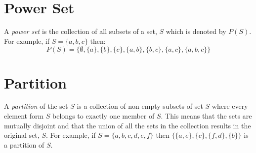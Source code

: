 \section{Power Set}
A \textit{power set} is the collection of all subsets of a set, $S$ which is denoted by $P(S)$. For example, if $S = \{a, b, c\}$ then:
\[P(S) = \{ \emptyset, \{a\}, \{b\}, \{c\}, \{a, b\}, \{b, c\}, \{a, c\}, \{a, b, c\} \}\]

\section{Partition}
A \textit{partition} of the set $S$ is a collection of non-empty subsets of set $S$ where every element form $S$ belongs to exactly one member of $S$. This means that the sets are mutually disjoint and that the union of all the sets in the collection results in the original set, $S$. For example, if $S = \{a, b, c, d, e, f\}$ then $\{\{a,e\}, \{c\}, \{f,d\},\{b\}\}$ is a partition of $S$.